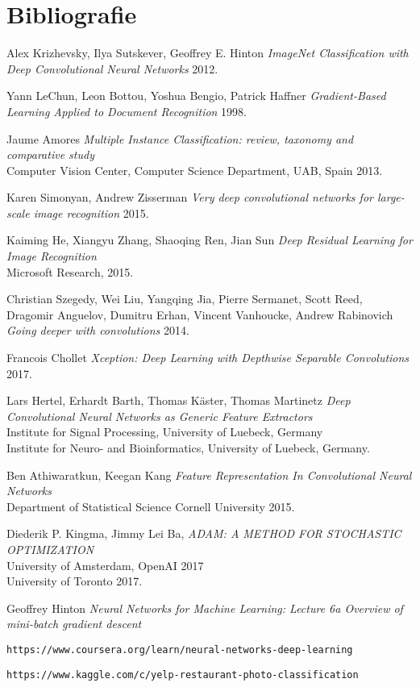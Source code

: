 \section*{Bibliografie}
\begingroup
\renewcommand{\section}[2]{}
\begin{thebibliography}{1}

 Alex Krizhevsky, Ilya Sutskever, Geoffrey E. Hinton {\em ImageNet Classification with Deep Convolutional Neural Networks}  2012.

 Yann LeChun, Leon Bottou, Yoshua Bengio, Patrick Haffner {\em Gradient-Based Learning Applied to Document Recognition} 1998.

 Jaume Amores {\em Multiple Instance Classification: review, taxonomy and
comparative study} \\
Computer Vision Center, Computer Science Department, UAB, Spain 2013.

 Karen Simonyan, Andrew Zisserman {\em Very deep convolutional networks for large-scale image recognition} 2015.

  Kaiming He, Xiangyu Zhang,  Shaoqing Ren, Jian Sun {\em Deep Residual Learning for Image Recognition} \\
Microsoft Research, 2015.

 Christian Szegedy, Wei Liu, Yangqing Jia, Pierre Sermanet, Scott Reed, Dragomir Anguelov, Dumitru Erhan, Vincent Vanhoucke, Andrew Rabinovich {\em Going deeper with convolutions} 2014.

 Francois Chollet {\em Xception: Deep Learning with Depthwise Separable Convolutions} 2017.

 Lars Hertel, Erhardt Barth, Thomas Käster, Thomas Martinetz {\em Deep Convolutional Neural Networks as Generic Feature Extractors} \\
Institute for Signal Processing, University of Luebeck, Germany \\
Institute for Neuro- and Bioinformatics, University of Luebeck, Germany.

 Ben Athiwaratkun, Keegan Kang {\em Feature Representation In Convolutional Neural
Networks} \\
Department of Statistical Science Cornell University 2015.

 Diederik P. Kingma, Jimmy Lei Ba, {\em ADAM: A METHOD FOR STOCHASTIC OPTIMIZATION} \\
University of Amsterdam, OpenAI 2017\\
University of Toronto 2017.

 Geoffrey Hinton {\em Neural Networks for Machine Learning: Lecture 6a	Overview of	mini-batch gradient descent	}

 \texttt{https://www.coursera.org/learn/neural-networks-deep-learning}

 \texttt{https://www.kaggle.com/c/yelp-restaurant-photo-classification}

\end{thebibliography}
\endgroup